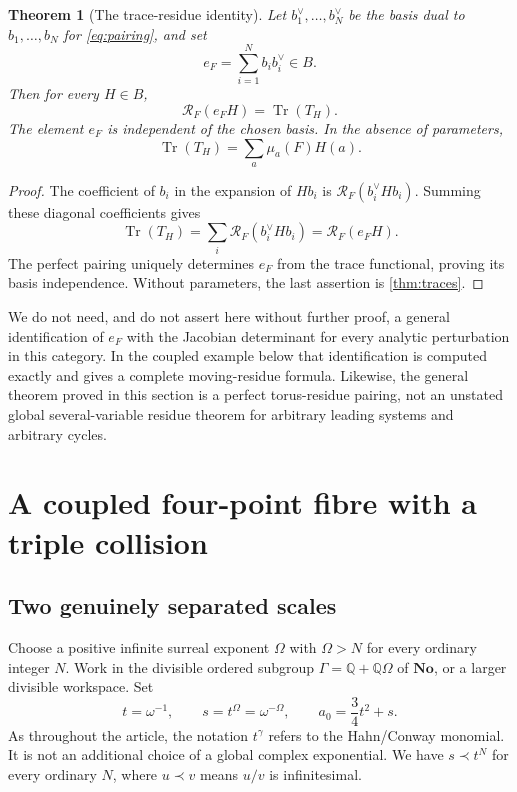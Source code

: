 \documentclass[11pt,letterpaper]{article}
\newtheorem{theorem}{Theorem}[section]
\theoremstyle{definition}
\theoremstyle{remark}
\newcommand{\No}{\mathbf{No}}
\newcommand{\Q}{\mathbb Q}
\newcommand{\Tr}{\operatorname{Tr}}
\numberwithin{equation}{section}
\begin{document}
\begin{theorem}[The trace-residue identity]\label{thm:euler}
Let $b_1^\vee,\ldots,b_N^\vee$ be the basis dual to $b_1,\ldots,b_N$ for \eqref{eq:pairing}, and set
\[
 e_F=\sum_{i=1}^N b_i b_i^\vee\in B.
\]
Then for every $H\in B$,
\begin{equation}\label{eq:euler}
 \mathcal R_F(e_FH)=\Tr(T_H).
\end{equation}
The element $e_F$ is independent of the chosen basis. In the absence of parameters,
\[
 \Tr(T_H)=\sum_a\mu_a(F)H(a).
\]
\end{theorem}
\begin{proof}
The coefficient of $b_i$ in the expansion of $Hb_i$ is $\mathcal R_F(b_i^\vee Hb_i)$. Summing these diagonal coefficients gives
\[
 \Tr(T_H)=\sum_i\mathcal R_F(b_i^\vee Hb_i)=\mathcal R_F(e_FH).
\]
The perfect pairing uniquely determines $e_F$ from the trace functional, proving its basis independence. Without parameters, the last assertion is \cref{thm:traces}.
\end{proof}
We do not need, and do not assert here without further proof, a general identification of $e_F$ with the Jacobian determinant for every analytic perturbation in this category. In the coupled example below that identification is computed exactly and gives a complete moving-residue formula. Likewise, the general theorem proved in this section is a perfect torus-residue pairing, not an unstated global several-variable residue theorem for arbitrary leading systems and arbitrary cycles.

\section{A coupled four-point fibre with a triple collision}\label{sec:example}
\subsection{Two genuinely separated scales}
Choose a positive infinite surreal exponent $\Omega$ with $\Omega>N$ for every ordinary integer $N$. Work in the divisible ordered subgroup $\Gamma=\Q+\Q\Omega$ of $\No$, or a larger divisible workspace. Set
\[
 t=\omega^{-1},\qquad s=t^\Omega=\omega^{-\Omega},\qquad
 a_0=\frac34t^2+s.
\]
As throughout the article, the notation $t^\gamma$ refers to the Hahn/Conway monomial. It is not an additional choice of a global complex exponential. We have $s\prec t^N$ for every ordinary $N$, where $u\prec v$ means $u/v$ is infinitesimal.
\end{document}

